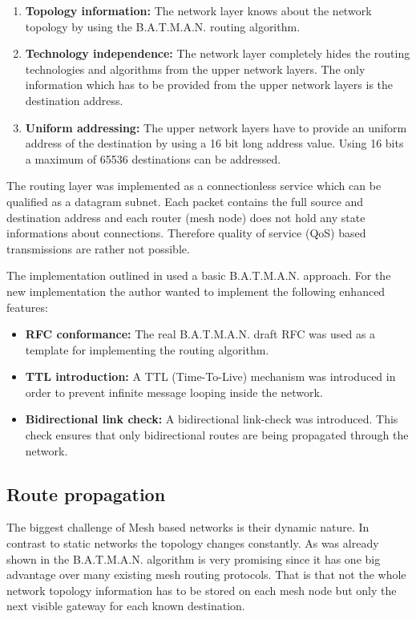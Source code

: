 \begin{enumerate}
    \item \textbf{Topology information:} The network layer knows about the network topology by using the B.A.T.M.A.N. routing algorithm.
    \item \textbf{Technology independence:} The network layer completely hides the routing technologies and algorithms from the upper network layers. The only information which has to be provided from the upper network layers is the destination address.
    \item \textbf{Uniform addressing:} The upper network layers have to provide an uniform address of the destination by using a 16 bit long address value. Using 16 bits a maximum of 65536 destinations can be addressed.
\end{enumerate}

The routing layer was implemented as a connectionless service which can be qualified as a datagram subnet. Each packet contains the full source and destination address and each router (mesh node) does not hold any state informations about connections. Therefore quality of service (QoS) based transmissions are rather not possible.

The implementation outlined in \cite{korniowski} used a basic B.A.T.M.A.N. approach. For the new implementation the author wanted to implement the following enhanced features:

\begin{itemize}
    \item \textbf{RFC conformance:} The real B.A.T.M.A.N. draft RFC \cite{batmanrfc} was used as a template for implementing the routing algorithm.
    \item \textbf{TTL introduction:} A TTL (Time-To-Live) mechanism was introduced in order to prevent infinite message looping inside the network.
    \item \textbf{Bidirectional link check:} A bidirectional link-check was introduced. This check ensures that only bidirectional routes are being propagated through the network.
\end{itemize}

\subsection{Route propagation}%
\label{sub:route_propagation}
The biggest challenge of Mesh based networks is their dynamic nature. In contrast to static networks the topology changes constantly. As was already shown in \cite{korniowski} the B.A.T.M.A.N. algorithm is very promising since it has one big advantage over many existing mesh routing protocols. That is that not the whole network topology information has to be stored on each mesh node but only the next visible gateway for each known destination.

